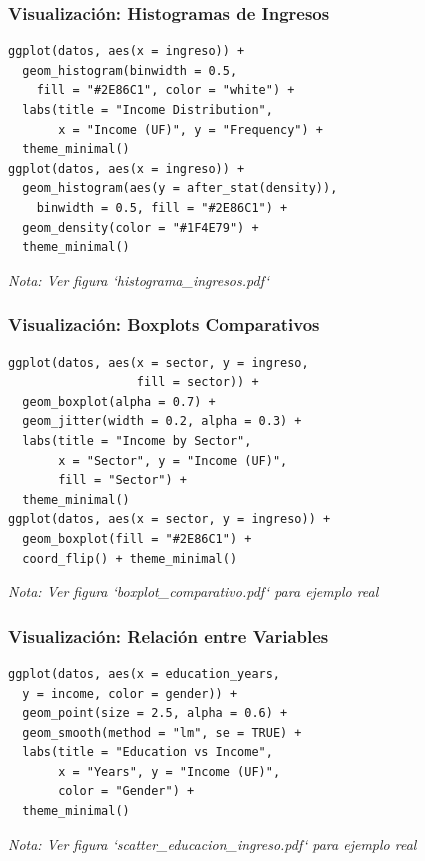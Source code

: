 \documentclass[aspectratio=169,11pt]{beamer}
\begin{document}
\begin{frame}[fragile]
\frametitle{Visualización: Histogramas de Ingresos}

\begin{lstlisting}[basicstyle=\ttfamily\tiny]
ggplot(datos, aes(x = ingreso)) +
  geom_histogram(binwidth = 0.5,
    fill = "#2E86C1", color = "white") +
  labs(title = "Income Distribution",
       x = "Income (UF)", y = "Frequency") +
  theme_minimal()
ggplot(datos, aes(x = ingreso)) +
  geom_histogram(aes(y = after_stat(density)),
    binwidth = 0.5, fill = "#2E86C1") +
  geom_density(color = "#1F4E79") +
  theme_minimal()
\end{lstlisting}

\textit{Nota: Ver figura `histograma_ingresos.pdf`}
\end{frame}

\begin{frame}[fragile]
\frametitle{Visualización: Boxplots Comparativos}

\begin{lstlisting}[basicstyle=\ttfamily\tiny]
ggplot(datos, aes(x = sector, y = ingreso,
                  fill = sector)) +
  geom_boxplot(alpha = 0.7) +
  geom_jitter(width = 0.2, alpha = 0.3) +
  labs(title = "Income by Sector",
       x = "Sector", y = "Income (UF)",
       fill = "Sector") +
  theme_minimal()
ggplot(datos, aes(x = sector, y = ingreso)) +
  geom_boxplot(fill = "#2E86C1") +
  coord_flip() + theme_minimal()
\end{lstlisting}

\vspace{0.3cm}
\textit{Nota: Ver figura `boxplot_comparativo.pdf` para ejemplo real}
\end{frame}

\begin{frame}[fragile]
\frametitle{Visualización: Relación entre Variables}

\begin{lstlisting}[basicstyle=\ttfamily\tiny]
ggplot(datos, aes(x = education_years,
  y = income, color = gender)) +
  geom_point(size = 2.5, alpha = 0.6) +
  geom_smooth(method = "lm", se = TRUE) +
  labs(title = "Education vs Income",
       x = "Years", y = "Income (UF)",
       color = "Gender") +
  theme_minimal()
\end{lstlisting}

\textit{Nota: Ver figura `scatter_educacion_ingreso.pdf` para ejemplo real}
\end{frame}
\end{document}
